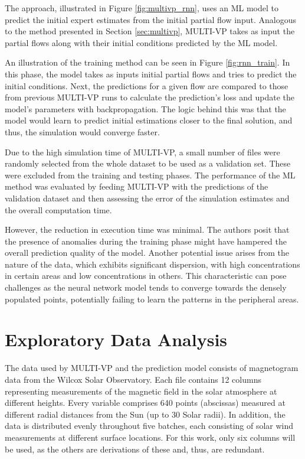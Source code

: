 The approach, illustrated in Figure \ref{fig:multivp_rnn}, uses an ML model to predict the initial expert estimates from the initial partial flow input. Analogous to the method presented in Section \ref{sec:multivp}, MULTI-VP takes as input the partial flows along with their initial conditions predicted by the ML model.

An illustration of the training method can be seen in Figure \ref{fig:rnn_train}. In this phase, the model takes as inputs initial partial flows and tries to predict the initial conditions. Next, the predictions for a given flow are compared to those from previous MULTI-VP runs to calculate the prediction's loss and update the model's parameters with backpropagation. The logic behind this was that the model would learn to predict initial estimations closer to the final solution, and thus, the simulation would converge faster.

Due to the high simulation time of MULTI-VP, a small number of files were randomly selected from the whole dataset to be used as a validation set. These were excluded from the training and testing phases. The performance of the ML method was evaluated by feeding MULTI-VP with the predictions of the validation dataset and then assessing the error of the simulation estimates and the overall computation time.

However, the reduction in execution time was minimal. The authors posit that the presence of anomalies during the training phase might have hampered the overall prediction quality of the model. Another potential issue arises from the nature of the data, which exhibits significant dispersion, with high concentrations in certain areas and low concentrations in others. This characteristic can pose challenges as the neural network model tends to converge towards the densely populated points, potentially failing to learn the patterns in the peripheral areas.

\section{Exploratory Data Analysis}\label{sec:data_analyis}
The data used by MULTI-VP and the prediction model consists of magnetogram data from the Wilcox Solar Observatory. Each file contains 12 columns representing measurements of the magnetic field in the solar atmosphere at different heights. Every variable comprises 640 points (abscissas) measured at different radial distances from the Sun (up to 30 Solar radii). In addition, the data is distributed evenly throughout five batches, each consisting of solar wind measurements at different surface locations. For this work, only six columns will be used, as the others are derivations of these and, thus, are redundant. 

